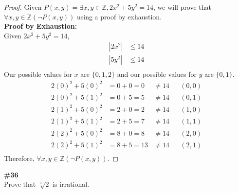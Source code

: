 \documentclass{article}
\newcommand{\problem}[1]{\textbf{\##1}\\}
\newcommand{\AllIntegers}{\mathbb{Z}}
\begin{document}
\begin{proof}
    Given \(P(x,y) = \exists x,y \in \AllIntegers, 2x^2 + 5y^2 = 14\), we will prove that \(\forall x,y \in \AllIntegers(\neg P(x,y))\) using a proof by exhaustion.\\
    \textbf{Proof by Exhaustion:}\\
    Given \(2x^2 + 5y^2 = 14\),
    \begin{align*}
        |2x^2| &\leq 14\\
        |5y^2| &\leq 14\\
    \end{align*}
    Our possible values for \(x\) are \(\{0,1,2\}\) and our possible values for \(y\) are \(\{0,1\}\).\\
    \begin{align*}
        2(0)^2 + 5(0)^2 &= 0 + 0 = 0 &\neq 14&&(0,0)\\
        2(0)^2 + 5(1)^2 &= 0 + 5 = 5 &\neq 14&&(0,1)\\
        2(1)^2 + 5(0)^2 &= 2 + 0 = 2 &\neq 14&&(1,0)\\
        2(1)^2 + 5(1)^2 &= 2 + 5 = 7 &\neq 14&&(1,1)\\
        2(2)^2 + 5(0)^2 &= 8 + 0 = 8 &\neq 14&&(2,0)\\
        2(2)^2 + 5(1)^2 &= 8 + 5 = 13 &\neq 14&&(2,1)\\
    \end{align*}
    Therefore, \(\forall x,y \in \AllIntegers(\neg P(x,y))\).
\end{proof}

\pagebreak
\problem{36}
Prove that \(\sqrt[3]{2}\) is irrational.
\end{document}
